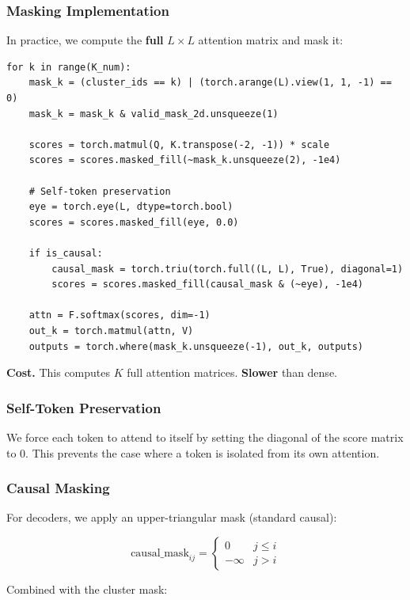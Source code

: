 \subsubsection{Masking Implementation}

In practice, we compute the \textbf{full} $L \times L$ attention matrix and mask 
it:

\begin{lstlisting}
for k in range(K_num):
    mask_k = (cluster_ids == k) | (torch.arange(L).view(1, 1, -1) == 0)
    mask_k = mask_k & valid_mask_2d.unsqueeze(1)
    
    scores = torch.matmul(Q, K.transpose(-2, -1)) * scale
    scores = scores.masked_fill(~mask_k.unsqueeze(2), -1e4)
    
    # Self-token preservation
    eye = torch.eye(L, dtype=torch.bool)
    scores = scores.masked_fill(eye, 0.0)
    
    if is_causal:
        causal_mask = torch.triu(torch.full((L, L), True), diagonal=1)
        scores = scores.masked_fill(causal_mask & (~eye), -1e4)
    
    attn = F.softmax(scores, dim=-1)
    out_k = torch.matmul(attn, V)
    outputs = torch.where(mask_k.unsqueeze(-1), out_k, outputs)
\end{lstlisting}

\textbf{Cost.} This computes $K$ full attention matrices. \textbf{Slower} than dense.

\subsubsection{Self-Token Preservation}

We force each token to attend to itself by setting the diagonal of the score 
matrix to 0. This prevents the case where a token is isolated from its own 
attention.

\subsubsection{Causal Masking}

For decoders, we apply an upper-triangular mask (standard causal):

\[
\text{causal\_mask}_{ij} = \begin{cases} 0 & j \leq i \\ -\infty & j > i \end{cases}
\tag{4.4}
\]

Combined with the cluster mask:

